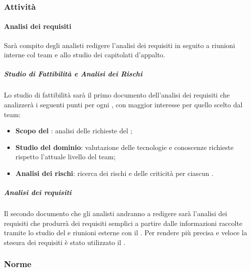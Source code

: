 \subsubsection{Attività}
		\paragraph{Analisi dei requisiti}
		Sarà compito degli analisti redigere l'analisi dei requisiti in seguito a riunioni interne col team e allo studio dei capitolati d'appalto.
			\subparagraph{Studio di Fattibilità e Analisi dei Rischi}
			Lo studio di fattibilità sarà il primo documento dell'analisi dei requisiti che analizzerà i seguenti punti per ogni , con maggior interesse per quello scelto dal team:
			\begin{itemize}
				\item \textbf{Scopo del }: analisi delle richieste del ;
				\item \textbf{Studio del dominio}: valutazione delle tecnologie e conoscenze richieste rispetto l'attuale livello del team;
				\item \textbf{Analisi dei rischi}: ricerca dei rischi e delle criticità per ciascun .
			\end{itemize}
			\subparagraph{Analisi dei requisiti}
			Il secondo documento che gli analisti andranno a redigere sarà l'analisi dei requisiti che produrrà dei requisiti semplici a partire dalle informazioni raccolte tramite lo studio del  e riunioni esterne con il .
			Per rendere più precisa e veloce la stesura dei requisiti è stato utilizzato il  .
	\subsubsection{Norme}
